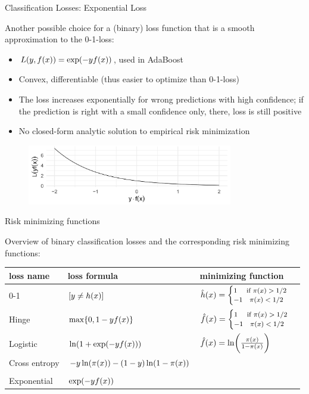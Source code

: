 \begin{vbframe}{Classification Losses: Exponential Loss}

Another possible choice for a (binary) loss function that is a smooth approximation to the 0-1-loss:
\begin{itemize}
\item $L(y, f(x)) = \exp(-yf(x))$, used in AdaBoost
\item Convex, differentiable (thus easier to optimize than 0-1-loss)
\item The loss increases exponentially for wrong predictions with high confidence; if the prediction is right with a small confidence only, there, loss is still positive
\item No closed-form analytic solution to empirical risk minimization
\end{itemize}


\begin{figure}
\includegraphics[width = 0.8\textwidth]{figure_man/exponential-loss.png}
\end{figure}


\end{vbframe}

\begin{vbframe}{Risk minimizing functions}

Overview of binary classification losses and the corresponding risk minimizing functions:

\lz

\begin{tabular}{p{2.5cm}|p{3.5cm}|p{4.5cm}}
  loss name & loss formula  & minimizing function \\
  \hline
  0-1 & $[y \neq h(x)]$ & $\hat{h}(x) = \footnotesize \begin{cases} 1 \quad \text{ if } \pi(x) > 1/2 \\ -1 \quad \pi(x) < 1/2  \end{cases}$ \\
  Hinge & $\max\{0, 1 - y f(x)\}$ & $\hat{f}(x) =  \footnotesize \begin{cases} 1 \quad \text{ if } \pi(x) > 1/2 \\ -1 \quad \pi(x) < 1/2  \end{cases}$ \\
  Logistic & $\ln(1+\exp(-yf(x)))$ & $\hat{f}(x) =  \ln \biggl(\frac{\pi(x)}{1-\pi(x)}\biggr)$ \\
  Cross entropy & $-y\ln(\pix) \newline -(1-y)\ln(1-\pix)$ & \\
  & & \\
  Exponential & $\exp(-yf(x))$ &

\end{tabular}

\end{vbframe}

